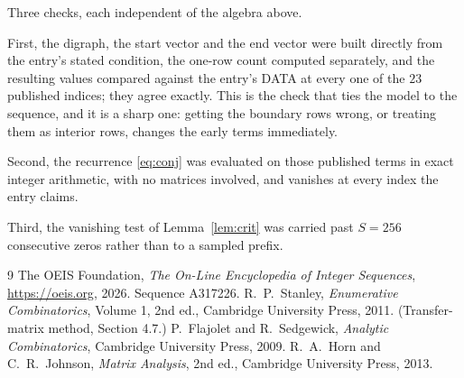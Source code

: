 \documentclass[11pt,a4paper]{article}
\theoremstyle{plain}
\theoremstyle{definition}
\begin{document}
Three checks, each independent of the algebra above.

First, the digraph, the start vector and the end vector were built directly from the
entry's stated condition, the one-row count computed separately, and the resulting values
compared against the entry's DATA at every one of the $23$ published indices; they
agree exactly. This is the check that ties the model to the sequence, and it is a sharp one:
getting the boundary rows wrong, or treating them as interior rows, changes the early terms
immediately.

Second, the recurrence \eqref{eq:conj} was evaluated on those published terms in exact
integer arithmetic, with no matrices involved, and vanishes at every index the entry claims.

Third, the vanishing test of Lemma~\ref{lem:crit} was carried past $S=256$ consecutive
zeros rather than to a sampled prefix.

\begin{thebibliography}{9}
 The OEIS Foundation, \emph{The On-Line Encyclopedia of Integer
Sequences}, \url{https://oeis.org}, 2026. Sequence A317226.
 R.~P.~Stanley, \emph{Enumerative Combinatorics}, Volume 1, 2nd ed.,
Cambridge University Press, 2011. (Transfer-matrix method, Section 4.7.)
 P.~Flajolet and R.~Sedgewick, \emph{Analytic Combinatorics}, Cambridge
University Press, 2009.
 R.~A.~Horn and C.~R.~Johnson, \emph{Matrix Analysis}, 2nd ed., Cambridge
University Press, 2013.
\end{thebibliography}
\end{document}
